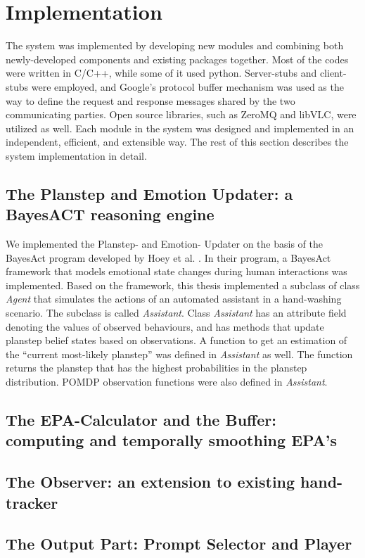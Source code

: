 \chapter{Implementation}
\label{chap:impl}

The system was implemented by developing new modules and combining both newly-developed components and existing packages together. Most of the codes were written in C/C++, while some of it used python. Server-stubs and client-stubs were employed, and Google's protocol buffer mechanism was used as the way to define the request and response messages shared by the two communicating parties. Open source libraries, such as ZeroMQ and libVLC, were utilized as well. Each module in the system was designed and implemented in an independent, efficient, and extensible way. The rest of this section describes the system implementation in detail.

\section{The Planstep and Emotion Updater: a BayesACT reasoning engine}

We implemented the Planstep- and Emotion- Updater on the basis of the BayesAct program developed by Hoey et al. \cite{hoey2013bayesian}. In their program, a BayesAct framework that models emotional state changes during human interactions was implemented. Based on the framework, this thesis implemented a subclass of class \textit{Agent} that simulates the actions of an automated assistant in a hand-washing scenario. The subclass is called \textit{Assistant}. Class \textit{Assistant} has an attribute field denoting the values of observed behaviours, and has methods that update planstep belief states based on observations. A function to get an estimation of the ``current most-likely planstep'' was defined in \textit{Assistant} as well. The function returns the planstep that has the highest probabilities in the planstep distribution. POMDP observation functions were also defined in \textit{Assistant}. 

\section{The EPA-Calculator and the Buffer: computing and temporally smoothing EPA's}

\section{The Observer: an extension to existing hand-tracker}

\section{The Output Part: Prompt Selector and Player}

